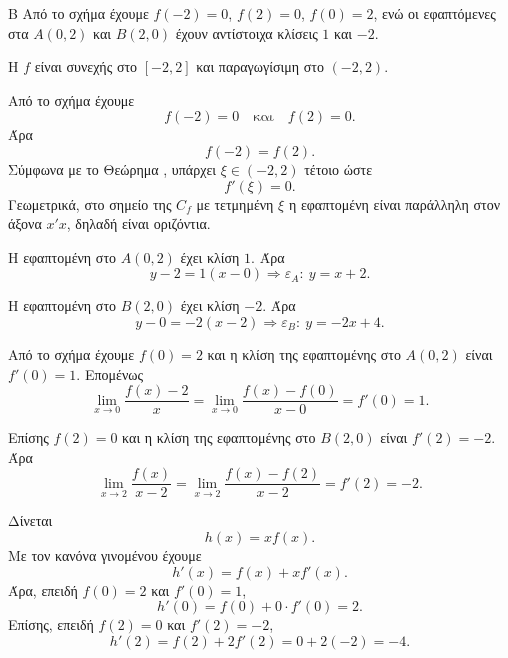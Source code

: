 \begin{thema}{Β}
Από το σχήμα έχουμε $f(-2)=0$, $f(2)=0$, $f(0)=2$, ενώ οι εφαπτόμενες στα $A(0,2)$ και $B(2,0)$ έχουν αντίστοιχα κλίσεις $1$ και $-2$.

\begin{erwthma}
\item Η $f$ είναι συνεχής στο $[-2,2]$ και παραγωγίσιμη στο $(-2,2)$.

Από το σχήμα έχουμε
\[
f(-2)=0
\quad\text{και}\quad
f(2)=0.
\]
Άρα
\[
f(-2)=f(2).
\]
Σύμφωνα με το Θεώρημα , υπάρχει $\xi\in(-2,2)$ τέτοιο ώστε
\[
f'(\xi)=0.
\]
Γεωμετρικά, στο σημείο της $C_f$ με τετμημένη $\xi$ η εφαπτομένη είναι παράλληλη στον άξονα $x'x$, δηλαδή είναι οριζόντια.

\item Η εφαπτομένη στο $A(0,2)$ έχει κλίση $1$. Άρα
\[
y-2=1(x-0)\Rightarrow \varepsilon_A:\ y=x+2.
\]

Η εφαπτομένη στο $B(2,0)$ έχει κλίση $-2$. Άρα
\[
y-0=-2(x-2)\Rightarrow \varepsilon_B:\ y=-2x+4.
\]

\item Από το σχήμα έχουμε $f(0)=2$ και η κλίση της εφαπτομένης στο $A(0,2)$ είναι $f'(0)=1$. Επομένως
\[
\lim_{x\to 0}\frac{f(x)-2}{x}
=\lim_{x\to 0}\frac{f(x)-f(0)}{x-0}
=f'(0)=1.
\]

Επίσης $f(2)=0$ και η κλίση της εφαπτομένης στο $B(2,0)$ είναι $f'(2)=-2$. Άρα
\[
\lim_{x\to 2}\frac{f(x)}{x-2}
=\lim_{x\to 2}\frac{f(x)-f(2)}{x-2}
=f'(2)=-2.
\]

\item Δίνεται
\[
h(x)=x f(x).
\]
Με τον κανόνα γινομένου έχουμε
\[
h'(x)=f(x)+x f'(x).
\]
Άρα, επειδή $f(0)=2$ και $f'(0)=1$,
\[
h'(0)=f(0)+0\cdot f'(0)=2.
\]
Επίσης, επειδή $f(2)=0$ και $f'(2)=-2$,
\[
h'(2)=f(2)+2f'(2)=0+2(-2)=-4.
\]
\end{erwthma}
\end{thema}



